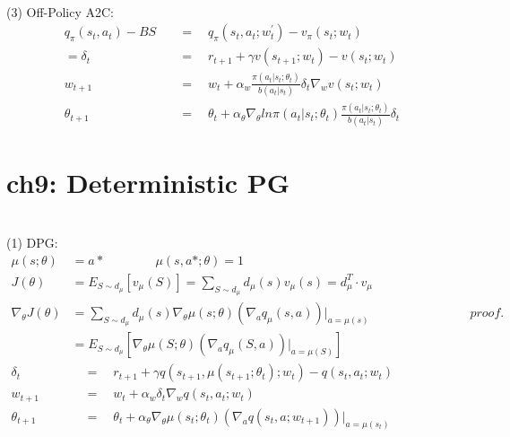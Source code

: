 \documentclass{article}
\begin{document}
~ \\[3pt]
(3) Off-Policy A2C: 
\begin{align*}
    q_{\pi}(s_{t}, a_{t}) - BS & 
            \quad = \quad 
            q_{\pi}(s_{t}, a_{t}; w_{t}^{'}) 
            - v_{\pi}(s_{t}; w_{t}) \\[3pt]
    = \delta_{t} & 
            \quad = \quad 
            r_{t+1} + \gamma v(s_{t+1}; w_{t}) 
            - v(s_{t}; w_{t}) \\[3pt]
    w_{t+1} & 
            \quad = \quad w_{t} + \alpha_{w} 
            \frac{ \pi (a_{t} | s_{t}; \theta_{t}) }{ b (a_{t} | s_{t}) } \delta_{t} 
            \nabla_{w} v(s_{t}; w_{t}) \\[3pt]
    \theta_{t+1} & 
            \quad = \quad \theta_{t} + \alpha_{\theta} \nabla_{\theta} 
            ln \pi (a_{t} | s_{t}; \theta_{t}) 
            \frac{ \pi (a_{t} | s_{t}; \theta_{t}) }{ b (a_{t} | s_{t}) } \delta_{t} 
\end{align*}


\newpage
\section*{ch9: Deterministic PG}


~ \\[3pt]
(1) DPG: 
\begin{align*}
    \mu (s; \theta) &= a* \qquad \qquad 
    \mu (s, a*; \theta) = 1 \\[3pt]
    J(\theta) &= E_{S \sim d_{\mu}} [ v_{\mu}(S) ] 
               = \sum_{S \sim d_{\mu}} d_{\mu}(s) v_{\mu}(s) 
               = d_{\mu}^{T} \cdot v_{\mu} \\[3pt]
    \nabla_{\theta} J(\theta) &= 
            \sum_{S \sim d_{\mu}} d_{\mu}(s) 
            \nabla_{\theta} \mu (s; \theta) 
            ( \nabla_{a} q_{\mu}(s, a) ) |_{a=\mu(s)} 
            \qquad \qquad \qquad \qquad proof. \\[3pt]
            &= 
            E_{S \sim d_{\mu}} \left[ 
                \nabla_{\theta} \mu (S; \theta) 
                ( \nabla_{a} q_{\mu}(S, a) ) |_{a=\mu(S)} 
            \right] \\[3pt]
    \delta_{t} & 
            \quad = \quad 
            r_{t+1} + \gamma q(s_{t+1}, \mu(s_{t+1}; \theta_{t}); w_{t}) 
            - q(s_{t}, a_{t}; w_{t}) \\[3pt]
    w_{t+1} & 
            \quad = \quad w_{t} + \alpha_{w} \delta_{t} 
            \nabla_{w} q(s_{t}, a_{t}; w_{t}) \\[3pt]
    \theta_{t+1} & 
            \quad = \quad \theta_{t} + \alpha_{\theta} 
            \nabla_{\theta} \mu(s_{t}; \theta_{t}) 
            ( \nabla_{a} q(s_{t}, a; w_{t+1}) ) |_{a=\mu(s_{t})} 
\end{align*}
\end{document}
